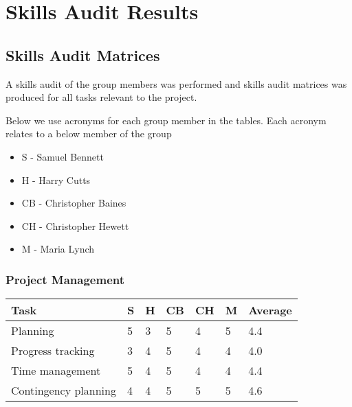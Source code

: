 \chapter{Skills Audit Results} \label{Chapter:Skills Audit Results}

\section{Skills Audit Matrices} 
\label{Section:Skills Audit Matrices}
A skills audit of the group members was performed and skills audit matrices was produced for all tasks relevant to the project.

Below we use acronyms for each group member in the tables. Each acronym relates to a below member of the group

\begin{itemize}
\item S - Samuel Bennett
\item H - Harry Cutts
\item CB - Christopher Baines
\item CH - Christopher Hewett
\item M - Maria Lynch
\end{itemize}

\subsection{Project Management} 
\begin{tabular}{ l || l | l | l | l | l || l}
  Task & S & H & CB & CH & M & Average \\ \hline
  Planning & 5  &  3  &  5  &  4  &  5  &  4.4 \\ 
  Progress tracking &  3  &  4  &  5  &  4  &  4  &  4.0 \\
  Time management &  5  &  4  &  5  &  4  &  4  &  4.4 \\
  Contingency planning &  4  &  4  &  5  &  5  &  5  &  4.6 \\
\end{tabular}

